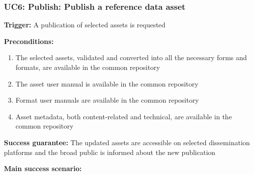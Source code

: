 	\subsubsection{UC6: Publish: Publish a reference data asset}
	\label{sec:uc6}		
	
	\textbf{Trigger:} A publication of selected assets is requested
	
	\textbf{Preconditions:} 
	\begin{enumerate}
		\item The selected assets, validated and converted into all the necessary forms and formats, are available in the common repository
		\item The asset user manual is available in the common repository
		\item Format user manuals are available in the common repository
		\item Asset metadata, both content-related and technical, are available in the common repository
	\end{enumerate}

	\textbf{Success guarantee:} The updated assets are accessible on selected dissemination platforms and the broad public is informed about the new publication

	\textbf{Main success scenario:} 
	
